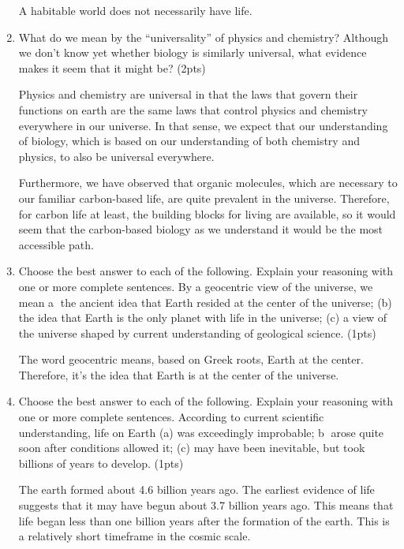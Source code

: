 \documentclass{article}
\begin{document}
\begin{enumerate}
    A habitable world does not necessarily have life.
    
    \item What do we mean by the “universality” of physics and chemistry? 
    Although we don’t know yet whether biology is similarly universal, what evidence makes it seem that it might be? (2pts)
    
    Physics and chemistry are universal in that the laws that govern their functions on earth are the same laws that control physics and chemistry everywhere in our universe.
    In that sense, we expect that our understanding of biology, which is based on our understanding of both chemistry and physics, to also be universal everywhere.
    
    Furthermore, we have observed that organic molecules, which are necessary to our familiar carbon-based life, are quite prevalent in the universe. Therefore, for carbon life at least, the building blocks for living are available, so it would seem that the carbon-based biology as we understand it would be the most accessible path.

    \item Choose the best answer to each of the following. Explain your reasoning with one or more complete sentences. 
    By a geocentric view of the universe, we mean 
    \textcircled{a} the ancient idea that Earth resided at the center of the universe; 
    (b) the idea that Earth is the only planet with life in the universe; 
    (c) a view of the universe shaped by current understanding of geological science. (1pts)

    The word geocentric means, based on Greek roots, Earth at the center. Therefore, it's the idea that Earth is at the center of the universe.
    
    \item Choose the best answer to each of the following. Explain your reasoning with one or more complete sentences.
    According to current scientific understanding, life on Earth 
    (a) was exceedingly improbable; 
    \textcircled{b} arose quite soon after conditions allowed it;
    (c) may have been inevitable, but took billions of years to develop. (1pts)
    
    The earth formed about 4.6 billion years ago. The earliest evidence of life suggests that it may have begun about 3.7 billion years ago. This means that life began less than one billion years after the formation of the earth. This is a relatively short timeframe in the cosmic scale. 


\end{enumerate}
\end{document}
